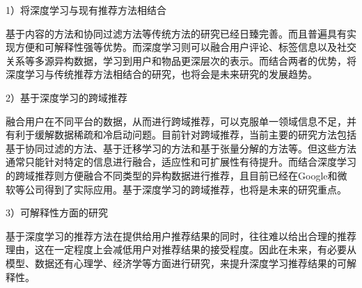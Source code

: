 1）将深度学习与现有推荐方法相结合

基于内容的方法和协同过滤方法等传统方法的研究已经日臻完善。而且普遍具有实现方便和可解释性强等优势。而深度学习则可以融合用户评论、标签信息以及社交关系等多源异构数据，学习到用户和物品更深层次的表示。而结合两者的优势，将深度学习与传统推荐方法相结合的研究，也将会是未来研究的发展趋势。

2）基于深度学习的跨域推荐

融合用户在不同平台的数据，从而进行跨域推荐，可以克服单一领域信息不足，并有利于缓解数据稀疏和冷启动问题。目前针对跨域推荐，当前主要的研究方法包括基于协同过滤的方法、基于迁移学习的方法和基于张量分解的方法等。但这些方法通常只能针对特定的信息进行融合，适应性和可扩展性有待提升。而结合深度学习的跨域推荐则方便融合不同类型的异构数据进行推荐，且目前已经在Google\cite{CovingtonAS16YouTube}和微软\cite{WuABSJ17RRN}等公司得到了实际应用。基于深度学习的跨域推荐，也将是未来的研究重点。

3）可解释性方面的研究

基于深度学习的推荐方法在提供给用户推荐结果的同时，往往难以给出合理的推荐理由，这在一定程度上会减低用户对推荐结果的接受程度。因此在未来，有必要从模型、数据还有心理学、经济学等方面进行研究，来提升深度学习推荐结果的可解释性。\cite{王国霞2012个性化推荐系统综述}








